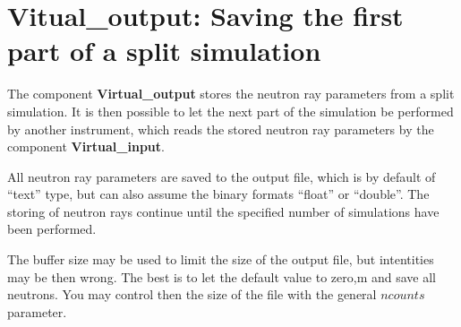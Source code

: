\section{Vitual\_output: Saving the first part of a split simulation}
\label{virtual_output}


The component {\bf Virtual\_output} stores the neutron ray parameters
from a split simulation. It is then possible to let the
next part of the simulation be performed by another instrument,
which reads the stored neutron ray
parameters by the component {\bf Virtual\_input}.

All neutron ray parameters are saved to the output file, which is by default
of ``text'' type, but can also assume the binary formats
``float'' or ``double''. The storing of neutron rays continue until the
specified number of simulations have been performed.

The buffer size may be used to limit the size of the output file, but intentities may be then wrong. The best is to let the default value to zero,m and save all neutrons. You may control then the size of the file with the general $ncounts$ parameter.
